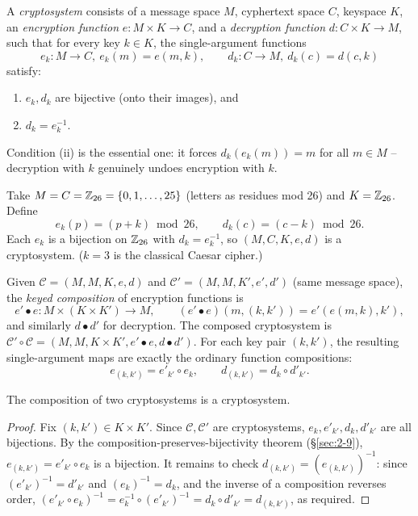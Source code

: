 \documentclass[11pt]{article}
\begin{document}
\begin{definition}[Cryptosystem]
A \emph{cryptosystem} consists of a message space $M$, cyphertext space $C$, keyspace $K$, an \emph{encryption function} $e: M \times K \to C$, and a \emph{decryption function} $d: C \times K \to M$, such that for every key $k \in K$, the single-argument functions
\[
e_k : M \to C,\ e_k(m) = e(m,k), \qquad d_k : C \to M,\ d_k(c) = d(c,k)
\]
satisfy:
\begin{enumerate}[label=(\roman*)]
    \item $e_k, d_k$ are bijective (onto their images), and
    \item $d_k = e_k^{-1}$.
\end{enumerate}
\end{definition}

\begin{note}
Condition (ii) is the essential one: it forces $d_k(e_k(m)) = m$ for all $m \in M$ -- decryption with $k$ genuinely undoes encryption with $k$.
\end{note}

\begin{example}
Take $M = C = \mathbb{Z}_{26} = \{0,1,\dots,25\}$ (letters as residues mod 26) and $K = \mathbb{Z}_{26}$. Define
\[
e_k(p) = (p+k) \bmod 26, \qquad d_k(c) = (c-k) \bmod 26.
\]
Each $e_k$ is a bijection on $\mathbb{Z}_{26}$ with $d_k = e_k^{-1}$, so $(M,C,K,e,d)$ is a cryptosystem. ($k=3$ is the classical Caesar cipher.)
\end{example}

\begin{definition}
Given $\mathcal{C} = (M,M,K,e,d)$ and $\mathcal{C}' = (M,M,K',e',d')$ (same message space), the \emph{keyed composition} of encryption functions is
\[
e' \bullet e : M \times (K \times K') \to M, \qquad (e' \bullet e)(m,(k,k')) = e'(e(m,k),k'),
\]
and similarly $d \bullet d'$ for decryption. The composed cryptosystem is $\mathcal{C}' \circ \mathcal{C} = (M,M,K\times K', e'\bullet e, d\bullet d')$. For each key pair $(k,k')$, the resulting single-argument maps are exactly the ordinary function compositions:
\[
e_{(k,k')} = e'_{k'} \circ e_k, \qquad d_{(k,k')} = d_k \circ d'_{k'}.
\]
\end{definition}

\begin{theorem}
The composition of two cryptosystems is a cryptosystem.
\end{theorem}
\begin{proof}
Fix $(k,k') \in K \times K'$. Since $\mathcal{C}, \mathcal{C}'$ are cryptosystems, $e_k, e'_{k'}, d_k, d'_{k'}$ are all bijections. By the composition-preserves-bijectivity theorem (\S\ref{sec:2-9}), $e_{(k,k')} = e'_{k'} \circ e_k$ is a bijection. It remains to check $d_{(k,k')} = (e_{(k,k')})^{-1}$: since $(e'_{k'})^{-1} = d'_{k'}$ and $(e_k)^{-1} = d_k$, and the inverse of a composition reverses order, $(e'_{k'}\circ e_k)^{-1} = e_k^{-1} \circ (e'_{k'})^{-1} = d_k \circ d'_{k'} = d_{(k,k')}$, as required.
\end{proof}
\end{document}
